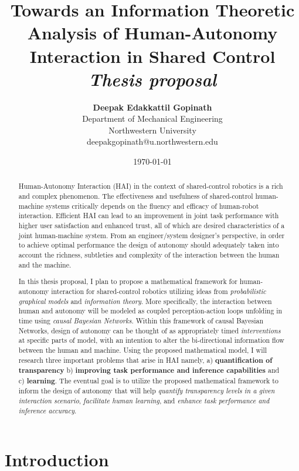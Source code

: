 \documentclass[12pt]{article}
\title{{\bf Towards an Information Theoretic Analysis of Human-Autonomy Interaction in Shared Control} \\
\it Thesis proposal}
\author{ {\bf Deepak Edakkattil Gopinath}  \\
Department of Mechanical Engineering \\
Northwestern University\\
{\small deepakgopinath@u.northwestern.edu}
}
\date{\today}
\begin{document}
\pagestyle{plain}
\maketitle

\pagebreak
\begin{abstract}
Human-Autonomy Interaction (HAI) in the context of shared-control robotics is a rich and complex phenomenon. The effectiveness and usefulness of shared-control human-machine systems critically depends on the fluency and efficacy of human-robot interaction. Efficient HAI can lead to an improvement in joint task performance with higher user satisfaction and enhanced trust, all of which are desired characteristics of a joint human-machine system. From an engineer/system designer's perspective, in order to achieve optimal performance the design of autonomy should adequately taken into account the richness, subtleties and complexity of the interaction between the human and the machine.

In this thesis proposal, I plan to propose a mathematical framework for human-autonomy interaction for shared-control robotics utilizing ideas from \textit{probabilistic graphical models} and \textit{information theory}. More specifically, the interaction between human and autonomy will be modeled as coupled perception-action loops unfolding in time using \textit{causal Bayesian Networks}. Within this framework of causal Bayesian Networks, design of autonomy can be thought of as appropriately timed \textit{interventions} at specific parts of model, with an intention to alter the bi-directional information flow between the human and machine. Using the proposed mathematical model, I will research three important problems that arise in HAI namely, a) \textbf{quantification of transparency} b) \textbf{improving task performance and inference capabilities} and c) \textbf{learning}. The eventual goal is to utilize the proposed mathematical framework to inform the design of autonomy that will help \textit{quantify transparency levels in a given interaction scenario}, \textit{facilitate human learning}, and \textit{enhance task performance and inference accuracy}.
\end{abstract}

\pagebreak
\tableofcontents
\pagebreak

\cleardoublepage
{}

\section{Introduction}
\label{sec:intro}
\end{document}

